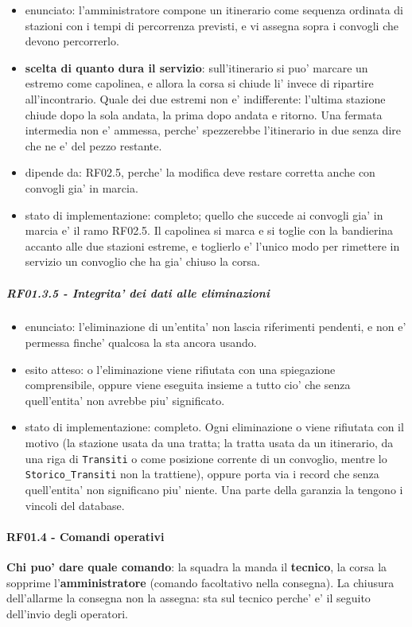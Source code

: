 \documentclass[11pt]{article}
\begin{document}
\begin{itemize}
\item enunciato: l'amministratore compone un itinerario come sequenza ordinata di stazioni con i tempi di
percorrenza previsti, e vi assegna sopra i convogli che devono percorrerlo.
\item \textbf{scelta di quanto dura il servizio}: sull'itinerario si puo' marcare un estremo come capolinea, e
allora la corsa si chiude li' invece di ripartire all'incontrario. Quale dei due estremi non e'
indifferente: l'ultima stazione chiude dopo la sola andata, la prima dopo andata e ritorno. Una
fermata intermedia non e' ammessa, perche' spezzerebbe l'itinerario in due senza dire che ne e'
del pezzo restante.
\item dipende da: RF02.5, perche' la modifica deve restare corretta anche con convogli gia' in marcia.
\item stato di implementazione: completo; quello che succede ai convogli gia' in marcia e' il ramo
RF02.5. Il capolinea si marca e si toglie con la bandierina accanto alle due stazioni estreme, e
toglierlo e' l'unico modo per rimettere in servizio un convoglio che ha gia' chiuso la corsa.
\end{itemize}
\subparagraph{RF01.3.5 - Integrita' dei dati alle eliminazioni}
\label{sec:org33a3e3a}
\begin{itemize}
\item enunciato: l'eliminazione di un'entita' non lascia riferimenti pendenti, e non e' permessa finche'
qualcosa la sta ancora usando.
\item esito atteso: o l'eliminazione viene rifiutata con una spiegazione comprensibile, oppure viene
eseguita insieme a tutto cio' che senza quell'entita' non avrebbe piu' significato.
\item stato di implementazione: completo. Ogni eliminazione o viene rifiutata con il motivo (la
stazione usata da una tratta; la tratta usata da un itinerario, da una riga di \texttt{Transiti} o come
posizione corrente di un convoglio, mentre lo \texttt{Storico\_Transiti} non la trattiene),
oppure porta via i record che senza quell'entita' non significano piu' niente. Una parte della
garanzia la tengono i vincoli del database.
\end{itemize}
\paragraph{RF01.4 - Comandi operativi}
\label{sec:orgefe7a48}

\textbf{Chi puo' dare quale comando}: la squadra la manda il \textbf{tecnico}, la corsa la sopprime
l'\textbf{amministratore} (comando facoltativo nella consegna). La chiusura dell'allarme la consegna non la
assegna: sta sul tecnico perche' e' il seguito dell'invio degli operatori.
\end{document}
